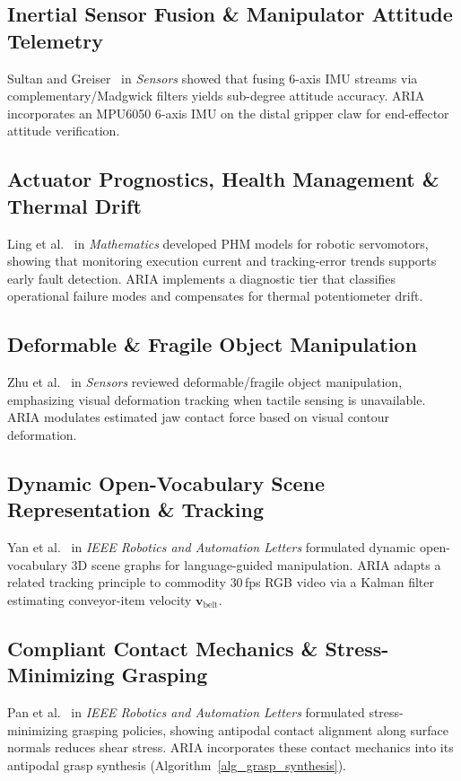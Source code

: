\documentclass[journal]{IEEEtran}
\begin{document}
\subsection{Inertial Sensor Fusion \& Manipulator Attitude Telemetry}
Sultan and Greiser~\cite{aria_118_team_2025_time} in \textit{Sensors} showed that fusing 6-axis IMU streams via complementary/Madgwick filters yields sub-degree attitude accuracy. ARIA incorporates an MPU6050 6-axis IMU on the distal gripper claw for end-effector attitude verification.

\subsection{Actuator Prognostics, Health Management \& Thermal Drift}
Ling et al.~\cite{aria_086_ling_2023_prognostics} in \textit{Mathematics} developed PHM models for robotic servomotors, showing that monitoring execution current and tracking-error trends supports early fault detection. ARIA implements a diagnostic tier that classifies operational failure modes and compensates for thermal potentiometer drift.

\subsection{Deformable \& Fragile Object Manipulation}
Zhu et al.~\cite{aria_119_zhu_2025_deformable} in \textit{Sensors} reviewed deformable/fragile object manipulation, emphasizing visual deformation tracking when tactile sensing is unavailable. ARIA modulates estimated jaw contact force based on visual contour deformation.

\subsection{Dynamic Open-Vocabulary Scene Representation \& Tracking}
Yan et al.~\cite{aria_055_yan_2025_dynamic} in \textit{IEEE Robotics and Automation Letters} formulated dynamic open-vocabulary 3D scene graphs for language-guided manipulation. ARIA adapts a related tracking principle to commodity 30\,fps RGB video via a Kalman filter estimating conveyor-item velocity $\mathbf{v}_{\text{belt}}$.

\subsection{Compliant Contact Mechanics \& Stress-Minimizing Grasping}
Pan et al.~\cite{aria_025_group_2023_stressminimizing} in \textit{IEEE Robotics and Automation Letters} formulated stress-minimizing grasping policies, showing antipodal contact alignment along surface normals reduces shear stress. ARIA incorporates these contact mechanics into its antipodal grasp synthesis (Algorithm~\ref{alg_grasp_synthesis}).
\end{document}
